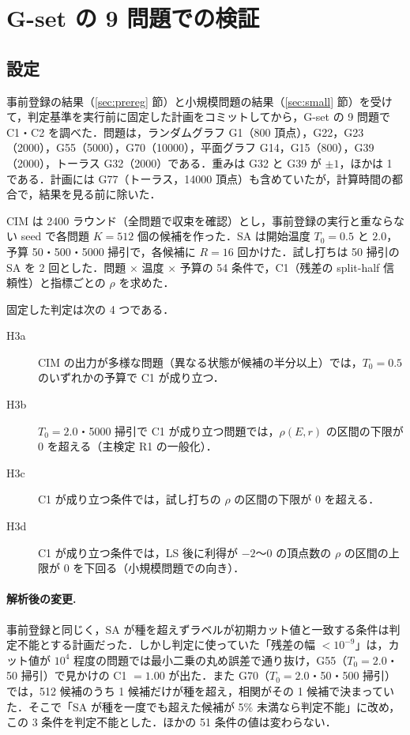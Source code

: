 \section{G-set の 9 問題での検証}\label{sec:gset}

\subsection{設定}

事前登録の結果（\ref{sec:prereg} 節）と小規模問題の結果（\ref{sec:small} 節）を受けて，判定基準を実行前に固定した計画をコミットしてから，G-set の 9 問題で C1・C2 を調べた．問題は，ランダムグラフ G1（800 頂点），G22，G23（2000），G55（5000），G70（10000），平面グラフ G14，G15（800），G39（2000），トーラス G32（2000）である．重みは G32 と G39 が $\pm1$，ほかは 1 である．計画には G77（トーラス，14000 頂点）も含めていたが，計算時間の都合で，結果を見る前に除いた．

CIM は 2400 ラウンド（全問題で収束を確認）とし，事前登録の実行と重ならない seed で各問題 $K=512$ 個の候補を作った．SA は開始温度 $T_0=0.5$ と $2.0$，予算 50・500・5000 掃引で，各候補に $R=16$ 回かけた．試し打ちは 50 掃引の SA を 2 回とした．問題 × 温度 × 予算の 54 条件で，C1（残差の split-half 信頼性）と指標ごとの $\rho$ を求めた．

固定した判定は次の 4 つである．
\begin{description}
  \item[H3a] CIM の出力が多様な問題（異なる状態が候補の半分以上）では，$T_0=0.5$ のいずれかの予算で C1 が成り立つ．
  \item[H3b] $T_0=2.0$・5000 掃引で C1 が成り立つ問題では，$\rho(E,r)$ の区間の下限が 0 を超える（主検定 R1 の一般化）．
  \item[H3c] C1 が成り立つ条件では，試し打ちの $\rho$ の区間の下限が 0 を超える．
  \item[H3d] C1 が成り立つ条件では，LS 後に利得が $-2$〜$0$ の頂点数の $\rho$ の区間の上限が 0 を下回る（小規模問題での向き）．
\end{description}

\paragraph{解析後の変更.} 事前登録と同じく，SA が種を超えずラベルが初期カット値と一致する条件は判定不能とする計画だった．しかし判定に使っていた「残差の幅 $<10^{-9}$」は，カット値が $10^4$ 程度の問題では最小二乗の丸め誤差で通り抜け，G55（$T_0=2.0$・50 掃引）で見かけの C1 $=1.00$ が出た．また G70（$T_0=2.0$・50・500 掃引）では，512 候補のうち 1 候補だけが種を超え，相関がその 1 候補で決まっていた．そこで「SA が種を一度でも超えた候補が 5\% 未満なら判定不能」に改め，この 3 条件を判定不能とした．ほかの 51 条件の値は変わらない．

